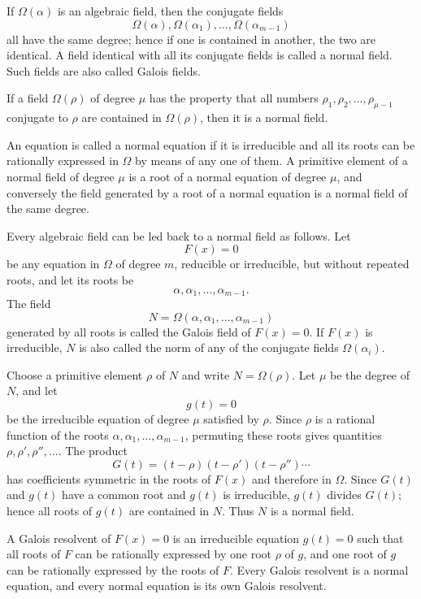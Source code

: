 \documentclass[11pt]{article}
\begin{document}
If $\Omega(\alpha)$ is an algebraic field, then the conjugate fields
\[
        \Omega(\alpha),\Omega(\alpha_1),\ldots,\Omega(\alpha_{m-1})
\]
all have the same degree; hence if one is contained in another, the two are identical. A field identical with all its conjugate fields is called a normal field. Such fields are also called Galois fields.

If a field $\Omega(\rho)$ of degree $\mu$ has the property that all numbers $\rho_1,\rho_2,\ldots,\rho_{\mu-1}$ conjugate to $\rho$ are contained in $\Omega(\rho)$, then it is a normal field.

An equation is called a normal equation if it is irreducible and all its roots can be rationally expressed in $\Omega$ by means of any one of them. A primitive element of a normal field of degree $\mu$ is a root of a normal equation of degree $\mu$, and conversely the field generated by a root of a normal equation is a normal field of the same degree.

Every algebraic field can be led back to a normal field as follows. Let
\[
\tag{1}
        F(x)=0
\]
be any equation in $\Omega$ of degree $m$, reducible or irreducible, but without repeated roots, and let its roots be
\[
\tag{2}
        \alpha,\alpha_1,\ldots,\alpha_{m-1}.
\]
The field
\[
\tag{4}
        N=\Omega(\alpha,\alpha_1,\ldots,\alpha_{m-1})
\]
generated by all roots is called the Galois field of $F(x)=0$. If $F(x)$ is irreducible, $N$ is also called the norm of any of the conjugate fields $\Omega(\alpha_i)$.

Choose a primitive element $\rho$ of $N$ and write $N=\Omega(\rho)$. Let $\mu$ be the degree of $N$, and let
\[
\tag{5}
        g(t)=0
\]
be the irreducible equation of degree $\mu$ satisfied by $\rho$. Since $\rho$ is a rational function of the roots $\alpha,\alpha_1,\ldots,\alpha_{m-1}$, permuting these roots gives quantities $\rho,\rho',\rho'',\ldots$. The product
\[
        G(t)=(t-\rho)(t-\rho')(t-\rho'')\cdots
\]
has coefficients symmetric in the roots of $F(x)$ and therefore in $\Omega$. Since $G(t)$ and $g(t)$ have a common root and $g(t)$ is irreducible, $g(t)$ divides $G(t)$; hence all roots of $g(t)$ are contained in $N$. Thus $N$ is a normal field.

A Galois resolvent of $F(x)=0$ is an irreducible equation $g(t)=0$ such that all roots of $F$ can be rationally expressed by one root $\rho$ of $g$, and one root of $g$ can be rationally expressed by the roots of $F$. Every Galois resolvent is a normal equation, and every normal equation is its own Galois resolvent.
\end{document}
